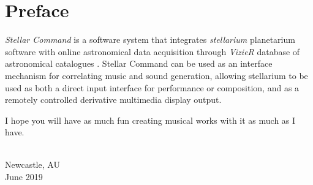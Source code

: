 \chapter{Preface}
    
    \textit{Stellar Command} is a software system that integrates \textit{stellarium} planetarium software with online astronomical data acquisition through \textit{VizieR} database of astronomical catalogues \cite{ochsenbein2000vizier}. Stellar Command can be used as an interface mechanism for correlating music and sound generation, allowing stellarium to be used as both a direct input interface for performance or composition, and as a remotely controlled derivative multimedia display output.

	I hope you will have as much fun creating musical works with it as much as I have.
{ \\ Newcastle, AU \\ June 2019\par}